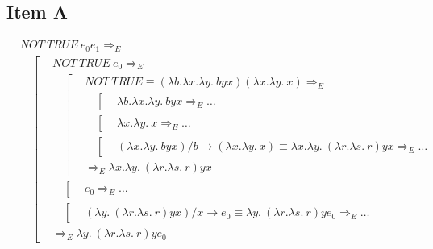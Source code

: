 \documentclass{article}
\begin{document}
\subsection*{Item A}
\begin{equation*}
  \begin{aligned}
    &NOT\ TRUE\ e_0 e_1 \Rightarrow_E \\ 
    &\quad\left[
      \begin{aligned}
        &NOT\ TRUE\ e_0 \Rightarrow_E \\
        &\quad\left[
          \begin{aligned}
            &NOT\ TRUE \equiv (\lambda b.\lambda x.\lambda y.\ byx)(\lambda x.\lambda y.\ x) \Rightarrow_E \\ 
            &\quad\left[
              \begin{aligned}
                &\lambda b.\lambda x.\lambda y.\ byx \Rightarrow_E \dots
              \end{aligned}
            \right. \\
            &\quad\left[
              \begin{aligned}
                &\lambda x.\lambda y.\ x \Rightarrow_E \dots
              \end{aligned}
            \right. \\
            &\quad\left[
              \begin{aligned}
                &(\lambda x.\lambda y.\ byx) / b \to (\lambda x.\lambda y.\ x) \equiv \lambda x.\lambda y.\ (\lambda r.\lambda s.\ r)yx \Rightarrow_E \dots
              \end{aligned}
            \right. \\ 
            &\Rightarrow_E \lambda x.\lambda y.\ (\lambda r.\lambda s.\ r)yx 
          \end{aligned}
        \right. \\
        &\quad\left[
          \begin{aligned}
            &e_0 \Rightarrow_E \dots
          \end{aligned}
        \right. \\
        &\quad\left[
          \begin{aligned}
            &(\lambda y.\ (\lambda r.\lambda s.\ r)yx) / x \to e_0 \equiv \lambda y.\ (\lambda r.\lambda s.\ r)ye_0 \Rightarrow_E \dots
          \end{aligned}
        \right. \\ 
        &\Rightarrow_E \lambda y.\ (\lambda r.\lambda s.\ r)ye_0 

\end{aligned}
\end{aligned}
\end{equation*}
\end{document}
